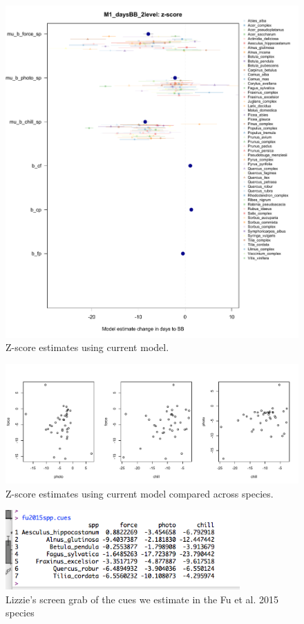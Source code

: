 \documentclass[11pt,letterpaper]{article}
\begin{document}
\begin{figure}[t!]
\centering
\includegraphics[width=1\textwidth]{..//..//analyses/bb_analysis/figures/M1winterZ_params_wcolor.pdf}
\caption{Z-score estimates using current model.}
  \label{fig:zscore}
\end{figure}
\clearpage


\begin{figure}[t!]
\centering
\includegraphics[width=1\textwidth]{..//..//analyses/bb_analysis/figures/M1winterZ_params_compspp.pdf}
\caption{Z-score estimates using current model compared across species.}
  \label{fig:sppcomp}
\end{figure}
\clearpage

\begin{figure}[t!]
\centering
\includegraphics[width=0.8\textwidth]{figures/fuspp.png}
\caption{Lizzie's screen grab of the cues we estimate in the Fu et al. 2015 species}
  \label{fig:fuspp}
\end{figure}
\clearpage
\end{document}
